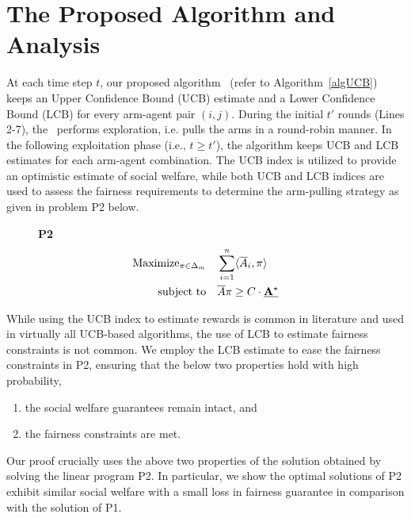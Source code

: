 \section{ The Proposed Algorithm and Analysis}\label{sec:UCB}
At each time step $t$, our proposed algorithm \ouralgo\  (refer to Algorithm~\ref{algUCB}) keeps an Upper Confidence Bound (UCB) estimate and a Lower Confidence Bound (LCB) for every arm-agent pair  $(i,j)$. During the initial $t'$ rounds (Lines 2-7), the \ouralgo\  performs exploration, i.e. pulls the arms in a round-robin manner. In the following exploitation phase (i.e., $t \geq t'$), the algorithm keeps UCB and LCB estimates for each arm-agent combination. The UCB index is utilized to provide an optimistic estimate of social welfare, while both UCB and LCB indices are used to assess the fairness requirements to determine the arm-pulling strategy as given in problem P2 below.
\begin{figure}[ht!]
    \centering
\centering 
\textbf{P2}
\begin{align}\label{P2}
\text{Maximize}_{ \pi \in \Delta_{m} } \quad & \sum_{i=1}^n \langle \overline{A}_i, \pi\rangle \\
\text{subject to} \quad & \overline{A} \pi  \geq C \cdot \underline{\mathbf{A}^{\star}} \nonumber
\end{align}
\end{figure}

 While using the UCB index to estimate rewards is common in literature and used in virtually all UCB-based algorithms, the use of LCB to estimate fairness constraints is not common.  We employ the LCB estimate to ease the fairness constraints in P2, ensuring that the below two properties hold with high probability,
\begin{enumerate}
    \item   the social welfare guarantees remain intact,  and   
    \item  the fairness constraints are met.
\end{enumerate}  
Our proof crucially uses the above two properties of the solution obtained by solving the linear program P2. In particular,  we show the optimal solutions of P2 exhibit similar  social welfare  with a  small loss in fairness guarantee   in comparison with the solution of P1. 

